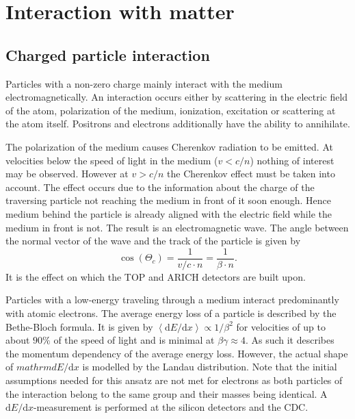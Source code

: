 \section{Interaction with matter}
\label{sec:interaction_with_matter}

\subsection{Charged particle interaction}
\label{subsec:interaction_with_matter}

Particles with a non-zero charge mainly interact with the medium electromagnetically. An interaction occurs either by scattering in the electric field of the atom, polarization of the medium, ionization, excitation or scattering at the atom itself. Positrons and electrons additionally have the ability to annihilate.

The polarization of the medium causes Cherenkov radiation to be emitted. At velocities below the speed of light in the medium ($v < c/n$) nothing of interest may be observed. However at $v > c/n$ the Cherenkov effect must be taken into account. The effect occurs due to the information about the charge of the traversing particle not reaching the medium in front of it soon enough. Hence medium behind the particle is already aligned with the electric field while the medium in front is not. The result is an electromagnetic wave. The angle between the normal vector of the wave and the track of the particle is given by
\begin{equation*}
	\cos(\Theta_{c}) = \frac{1}{v/c \cdot n} = \frac{1}{\beta \cdot n}
	\mathrm{.}
\end{equation*}
It is the effect on which the TOP and ARICH detectors are built upon.

Particles with a low-energy traveling through a medium interact predominantly with atomic electrons. The average energy loss of a particle is described by the Bethe-Bloch formula. It is given by $\left< \mathrm{d}E/\mathrm{d}x \right> \propto 1/{\beta^2}$ for velocities of up to about $90\%$ of the speed of light and is minimal at $\beta \gamma \approx 4$. As such it describes the momentum dependency of the average energy loss. However, the actual shape of $mathrm{d}E/\mathrm{d}x$ is modelled by the Landau distribution. Note that the initial assumptions needed for this ansatz are not met for electrons as both particles of the interaction belong to the same group and their masses being identical.
A $\mathrm{d}E/\mathrm{d}x$-measurement is performed at the silicon detectors and the CDC.

